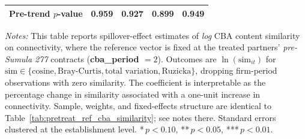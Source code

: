 \begin{table}[H]
\begin{tabular}{lcccc}
Pre-trend $p$-value & 0.959 & 0.927 & 0.899 & 0.949 \\
\hline\hline
\end{tabular}
\begin{minipage}{\linewidth}
\smallskip
\scriptsize\textit{Notes:} This table reports spillover-effect estimates of \emph{log} CBA content similarity on connectivity, where the reference vector is fixed at the treated partners' \textit{pre-Sumula 277} contracts (\textbf{cba\_period $= 2$}). Outcomes are $\ln(\text{sim}_{it})$ for $\text{sim} \in \{\text{cosine}, \text{Bray-Curtis}, \text{total variation}, \text{Ruzicka}\}$, dropping firm-period observations with zero similarity. The coefficient is interpretable as the percentage change in similarity associated with a one-unit increase in connectivity. Sample, weights, and fixed-effects structure are identical to Table~\ref{tab:pretreat_ref_cba_similarity}; see notes there. Standard errors clustered at the establishment level. *\,$p<0.10$, **\,$p<0.05$, ***\,$p<0.01$.
\end{minipage}
\end{table}
